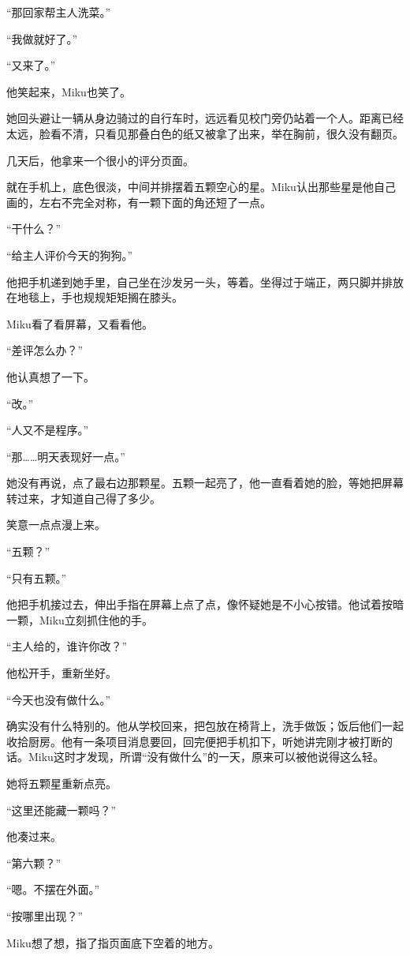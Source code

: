 “那回家帮主人洗菜。”

“我做就好了。”

“又来了。”

他笑起来，Miku也笑了。

她回头避让一辆从身边骑过的自行车时，远远看见校门旁仍站着一个人。距离已经太远，脸看不清，只看见那叠白色的纸又被拿了出来，举在胸前，很久没有翻页。

\SceneBreak

几天后，他拿来一个很小的评分页面。

就在手机上，底色很淡，中间并排摆着五颗空心的星。Miku认出那些星是他自己画的，左右不完全对称，有一颗下面的角还短了一点。

“干什么？”

“给主人评价今天的狗狗。”

他把手机递到她手里，自己坐在沙发另一头，等着。坐得过于端正，两只脚并排放在地毯上，手也规规矩矩搁在膝头。

Miku看了看屏幕，又看看他。

“差评怎么办？”

他认真想了一下。

“改。”

“人又不是程序。”

“那……明天表现好一点。”

她没有再说，点了最右边那颗星。五颗一起亮了，他一直看着她的脸，等她把屏幕转过来，才知道自己得了多少。

笑意一点点漫上来。

“五颗？”

“只有五颗。”

他把手机接过去，伸出手指在屏幕上点了点，像怀疑她是不小心按错。他试着按暗一颗，Miku立刻抓住他的手。

“主人给的，谁许你改？”

他松开手，重新坐好。

“今天也没有做什么。”

确实没有什么特别的。他从学校回来，把包放在椅背上，洗手做饭；饭后他们一起收拾厨房。他有一条项目消息要回，回完便把手机扣下，听她讲完刚才被打断的话。Miku这时才发现，所谓“没有做什么”的一天，原来可以被他说得这么轻。

她将五颗星重新点亮。

“这里还能藏一颗吗？”

他凑过来。

“第六颗？”

“嗯。不摆在外面。”

“按哪里出现？”

Miku想了想，指了指页面底下空着的地方。

